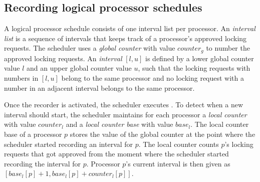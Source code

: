 \subsection{Recording logical processor schedules}\label{sec:recording logical processor schedules}
A logical processor schedule consists of one interval list per processor. An \emph{interval list} is a sequence of intervals that keeps track of a processor's approved locking requests. The scheduler uses a \emph{global counter} with value $counter_{g}$ to number the approved locking requests. An \emph{interval} $[l, u]$ is defined by a lower global counter value $l$ and an upper global counter value $u$, such that the locking requests with numbers in $[l, u]$ belong to the same processor and no locking request with a number in an adjacent interval belongs to the same processor.

Once the recorder is activated, the scheduler executes . To detect when a new interval should start, the scheduler maintains for each processor a \emph{local counter} with value $counter_{l}$ and a \emph{local counter base} with value $base_{l}$. The local counter base of a processor $p$ stores the value of the global counter at the point where the scheduler started recording an interval for $p$. The local counter counts $p$'s locking requests that got approved from the moment where the scheduler started recording the interval for $p$. Processor $p$'s current interval is then given as $[base_{l}[p] + 1, base_{l}[p] + counter_{l}[p]]$.

